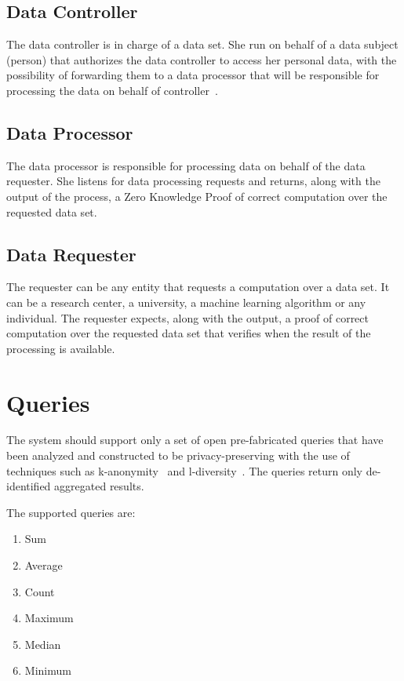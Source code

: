 \subsection{Data Controller}
\label{solution:entities:data_controller}

The data controller is in charge of a data set. She run on behalf of a data subject (person)
that authorizes the data controller to access her personal data, with the possibility of forwarding
them to a data processor that will be responsible for processing the data on behalf of controller~\cite{DBLP:journals/corr/NeisseSF17}.

\subsection{Data Processor}
\label{solution:entities:data_processor}

The data processor is responsible for processing data on behalf of the data requester. She listens
for data processing requests and returns, along with the output of the process, a Zero Knowledge Proof of correct computation over the requested data set.

\subsection{Data Requester}
\label{solution:entities:data_req}

The requester can be any entity that requests a computation over a data set. It can be a research center, a university, a machine learning algorithm or any individual. The requester expects, along with the output, a proof of correct computation over the requested data set that verifies when the result of the processing is available.

\section{Queries}
\label{solution:queries}

The system should support only a set of open pre-fabricated queries that have been analyzed and constructed to be privacy-preserving with the use of techniques such as k-anonymity~\cite{Samarati98protectingprivacy} and l-diversity~\cite{Aggarwal2008}. The queries return only de-identified aggregated results.

The supported queries are:

\begin{enumerate}
  \item Sum
  \item Average
  \item Count
  \item Maximum
  \item Median
  \item Minimum
\end{enumerate}

